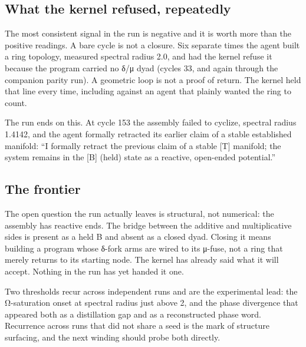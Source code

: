 \hypertarget{what-the-kernel-refused-repeatedly}{%
\subsection{What the kernel refused,
repeatedly}\label{what-the-kernel-refused-repeatedly}}

The most consistent signal in the run is negative and it is worth more
than the positive readings. A bare cycle is not a closure. Six separate
times the agent built a ring topology, measured spectral radius 2.0, and
had the kernel refuse it because the program carried no δ/μ dyad (cycles
33, and again through the companion parity run). A geometric loop is not
a proof of return. The kernel held that line every time, including
against an agent that plainly wanted the ring to count.

The run ends on this. At cycle 153 the assembly failed to cyclize,
spectral radius 1.4142, and the agent formally retracted its earlier
claim of a stable established manifold: ``I formally retract the
previous claim of a stable {[}T{]} manifold; the system remains in the
{[}B{]} (held) state as a reactive, open-ended potential.''

\hypertarget{the-frontier}{%
\subsection{The frontier}\label{the-frontier}}

The open question the run actually leaves is structural, not numerical:
the assembly has reactive ends. The bridge between the additive and
multiplicative sides is present as a held B and absent as a closed dyad.
Closing it means building a program whose δ-fork arms are wired to its
μ-fuse, not a ring that merely returns to its starting node. The kernel
has already said what it will accept. Nothing in the run has yet handed
it one.

Two thresholds recur across independent runs and are the experimental
lead: the Ω-saturation onset at spectral radius just above 2, and the
phase divergence that appeared both as a distillation gap and as a
reconstructed phase word. Recurrence across runs that did not share a
seed is the mark of structure surfacing, and the next winding should
probe both directly.
